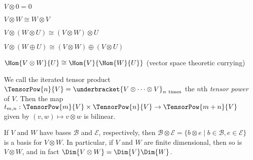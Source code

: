\documentclass{memoir}
\begin{document}
\begin{prp} \mbox{}
\begin{enumerate*}
\item $V \otimes 0 = 0$
\item $V \otimes W \cong W \otimes V$
\item $V \otimes (W \otimes U) \cong (V \otimes W) \otimes U$
\item $V \otimes (W \oplus U) \cong (V \otimes W) \oplus (V \otimes U)$
\item $\Hom{V \otimes W}{U} \cong \Hom{V}{\Hom{W}{U}}$ (vector space theoretic currying)
\item We call the iterated tensor product $\TensorPow{n}{V} = \underbracket{V \otimes \cdots \otimes V}_{n\ \text{times}}$ the $n$th \emph{tensor power} of $V$. Then the map $t_{m,n} : \TensorPow{m}{V} \times \TensorPow{n}{V} \rightarrow \TensorPow{m+n}{V}$ given by $(v,w) \mapsto v \otimes w$ is bilinear.
\end{enumerate*}
\end{prp}

\begin{prp}
If $V$ and $W$ have bases $\mathcal{B}$ and $\mathcal{E}$, respectively, then $\mathcal{B} \otimes \mathcal{E} = \{b \otimes e \mid b \in \mathcal{B}, e \in \mathcal{E}\}$ is a basis for $V \otimes W$. In particular, if $V$ and $W$ are finite dimensional, then so is $V \otimes W$, and in fact $\Dim{V \otimes W} = \Dim{V}\Dim{W}$.
\end{prp}
\end{document}
